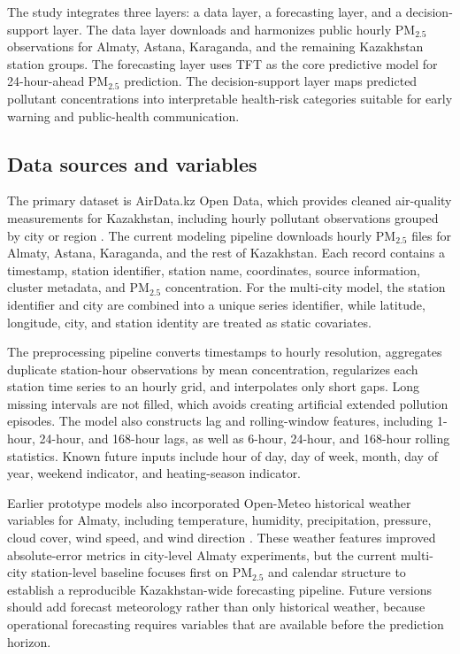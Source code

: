 \documentclass[pdflatex,sn-mathphys-num]{sn-jnl}
\begin{document}
The study integrates three layers: a data layer, a forecasting layer, and a decision-support layer. The data layer downloads and harmonizes public hourly PM$_{2.5}$ observations for Almaty, Astana, Karaganda, and the remaining Kazakhstan station groups. The forecasting layer uses TFT as the core predictive model for 24-hour-ahead PM$_{2.5}$ prediction. The decision-support layer maps predicted pollutant concentrations into interpretable health-risk categories suitable for early warning and public-health communication.

\subsection{Data sources and variables}\label{subsec:data}

The primary dataset is AirData.kz Open Data, which provides cleaned air-quality measurements for Kazakhstan, including hourly pollutant observations grouped by city or region \cite{airdatakz2026}. The current modeling pipeline downloads hourly PM$_{2.5}$ files for Almaty, Astana, Karaganda, and the rest of Kazakhstan. Each record contains a timestamp, station identifier, station name, coordinates, source information, cluster metadata, and PM$_{2.5}$ concentration. For the multi-city model, the station identifier and city are combined into a unique series identifier, while latitude, longitude, city, and station identity are treated as static covariates.

The preprocessing pipeline converts timestamps to hourly resolution, aggregates duplicate station-hour observations by mean concentration, regularizes each station time series to an hourly grid, and interpolates only short gaps. Long missing intervals are not filled, which avoids creating artificial extended pollution episodes. The model also constructs lag and rolling-window features, including 1-hour, 24-hour, and 168-hour lags, as well as 6-hour, 24-hour, and 168-hour rolling statistics. Known future inputs include hour of day, day of week, month, day of year, weekend indicator, and heating-season indicator.

Earlier prototype models also incorporated Open-Meteo historical weather variables for Almaty, including temperature, humidity, precipitation, pressure, cloud cover, wind speed, and wind direction \cite{openmeteo2026}. These weather features improved absolute-error metrics in city-level Almaty experiments, but the current multi-city station-level baseline focuses first on PM$_{2.5}$ and calendar structure to establish a reproducible Kazakhstan-wide forecasting pipeline. Future versions should add forecast meteorology rather than only historical weather, because operational forecasting requires variables that are available before the prediction horizon.
\end{document}
